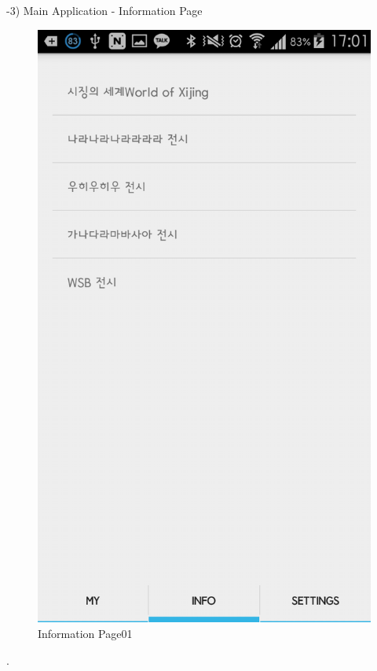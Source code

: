 \documentclass[conference]{IEEEtran}
\begin{document}
-3) Main Application - Information Page
\begin{figure}[htbp]
\begin{center}
    \includegraphics[scale=0.2]{img_capture07}
    \caption{Information Page01} 
\end{center}
\end{figure}

.\\\\\\\\
\end{document}
